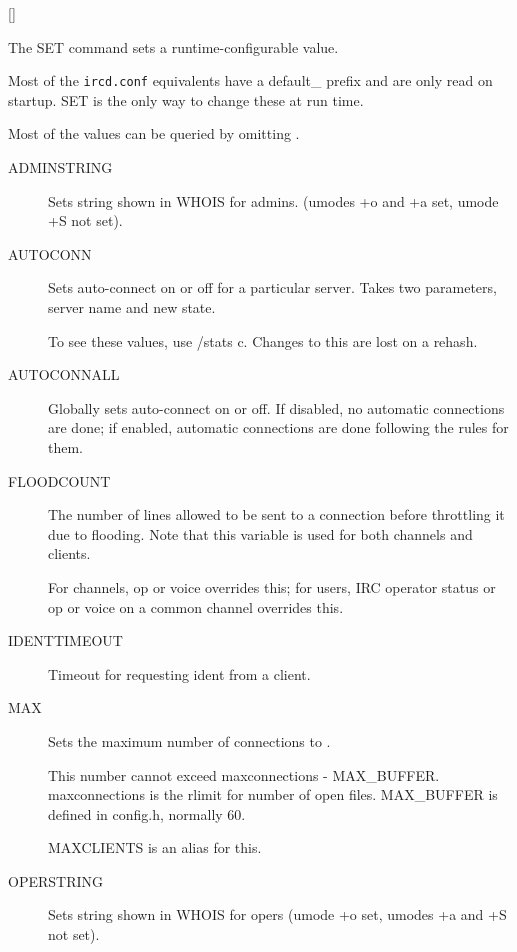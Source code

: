  [] 

	The SET command sets a runtime-{}configurable value.

	Most of the \nolinkurl{ircd.conf} equivalents have a default\_ prefix
	and are only read on startup. SET is the only way to change these at
	run time.

	Most of the values can be queried by omitting .

\noindent
\begin{description}
\item[{ADMINSTRING}]
	Sets string shown in WHOIS for admins. (umodes +o and +a set, umode +S
	not set).

\item[{AUTOCONN}]
	Sets auto-{}connect on or off for a particular server. Takes two
	parameters, server name and new state.

	To see these values, use /stats c. Changes to this are lost on a
	rehash.

\item[{AUTOCONNALL}]
	Globally sets auto-{}connect on or off. If disabled, no automatic
	connections are done; if enabled, automatic connections are done
	following the rules for them.

\item[{FLOODCOUNT}]
	The number of lines allowed to be sent to a connection before
	throttling it due to flooding. Note that this variable is used for both
	channels and clients.

	For channels, op or voice overrides this; for users, IRC operator
	status or op or voice on a common channel overrides this.

\item[{IDENTTIMEOUT}]
	Timeout for requesting ident from a client.

\item[{MAX}]
	Sets the maximum number of connections to .

	This number cannot exceed maxconnections -{} MAX\_BUFFER.
	maxconnections is the rlimit for number of open files. MAX\_BUFFER is
	defined in config.h, normally 60.

	MAXCLIENTS is an alias for this.

\item[{OPERSTRING}]
	Sets string shown in WHOIS for opers (umode +o set, umodes +a and +S
	not set).


\end{description}
